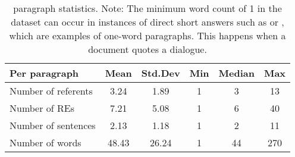 \begin{table}[ht]
\centering
\begin{tabular}{lccccc}
	\hline
	Per paragraph & Mean & Std.Dev & Min & Median & Max \\ 
	\hline
	Number of referents & 3.24 & 1.89 & 1 & 3 & 13 \\ 
	Number of REs & 7.21 & 5.08 & 1 & 6 & 40 \\ 
	Number of sentences & 2.13 & 1.18 & 1 & 2 & 11 \\ 
	Number of words & 48.43 & 26.24 & 1\footnotemark & 44 & 270 \\ 
	\hline
\end{tabular}
\caption{\wsj paragraph statistics. Note: The minimum word count of 1 in the dataset can occur in instances of direct short answers such as  or , which are examples of one-word paragraphs. This happens when a document quotes a dialogue.}\label{tab:inparstat}
\end{table}

